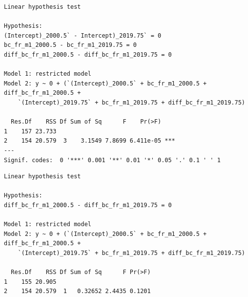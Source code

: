 \documentclass[
  a4paper,
  DIV=11,
  numbers=noendperiod,
  french]{scrartcl}
\newenvironment{Shaded}{\begin{snugshade}}{\end{snugshade}}
\newcommand{\AttributeTok}[1]{\textcolor[rgb]{0.40,0.45,0.13}{#1}}
\newcommand{\CommentTok}[1]{\textcolor[rgb]{0.37,0.37,0.37}{#1}}
\newcommand{\FunctionTok}[1]{\textcolor[rgb]{0.28,0.35,0.67}{#1}}
\newcommand{\NormalTok}[1]{\textcolor[rgb]{0.00,0.23,0.31}{#1}}
\newcommand{\SpecialCharTok}[1]{\textcolor[rgb]{0.37,0.37,0.37}{#1}}
\newcommand{\StringTok}[1]{\textcolor[rgb]{0.13,0.47,0.30}{#1}}
\newcommand\1{{\mathds 1}}
\theoremstyle{remark}
\begin{document}
\begin{verbatim}
Linear hypothesis test

Hypothesis:
(Intercept)_2000.5` - Intercept)_2019.75` = 0
bc_fr_m1_2000.5 - bc_fr_m1_2019.75 = 0
diff_bc_fr_m1_2000.5 - diff_bc_fr_m1_2019.75 = 0

Model 1: restricted model
Model 2: y ~ 0 + (`(Intercept)_2000.5` + bc_fr_m1_2000.5 + diff_bc_fr_m1_2000.5 + 
    `(Intercept)_2019.75` + bc_fr_m1_2019.75 + diff_bc_fr_m1_2019.75)

  Res.Df    RSS Df Sum of Sq      F    Pr(>F)    
1    157 23.733                                  
2    154 20.579  3    3.1549 7.8699 6.411e-05 ***
---
Signif. codes:  0 '***' 0.001 '**' 0.01 '*' 0.05 '.' 0.1 ' ' 1
\end{verbatim}

\begin{Shaded}
\end{Shaded}

\begin{verbatim}
Linear hypothesis test

Hypothesis:
diff_bc_fr_m1_2000.5 - diff_bc_fr_m1_2019.75 = 0

Model 1: restricted model
Model 2: y ~ 0 + (`(Intercept)_2000.5` + bc_fr_m1_2000.5 + diff_bc_fr_m1_2000.5 + 
    `(Intercept)_2019.75` + bc_fr_m1_2019.75 + diff_bc_fr_m1_2019.75)

  Res.Df    RSS Df Sum of Sq      F Pr(>F)
1    155 20.905                           
2    154 20.579  1   0.32652 2.4435 0.1201
\end{verbatim}

\begin{Shaded}
\end{Shaded}
\end{document}
